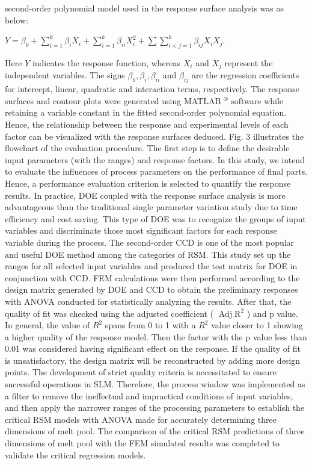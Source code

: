 \documentclass[10pt]{article}
\begin{document}
second-order polynomial model used in the response surface analysis was as below:

$Y=\beta_{0}+\sum_{i=1}^{k} \beta_{i} X_{i}+\sum_{i=1}^{k} \beta_{i i} X_{i}^{2}+\sum \sum_{i<j=1}^{k} \beta_{i j} X_{i} X_{j}$.

Here $Y$ indicates the response function, whereas $X_{i}$ and $X_{j}$ represent the independent variables. The signs $\beta_{0}, \beta_{i}, \beta_{i i}$ and $\beta_{i j}$ are the regression coefficients for intercept, linear, quadratic and interaction terms, respectively. The response surfaces and contour plots were generated using MATLAB ${ }^{\circledR}$ software while retaining a variable constant in the fitted second-order polynomial equation. Hence, the relationship between the response and experimental levels of each factor can be visualized with the response surfaces deduced. Fig. 3 illustrates the flowchart of the evaluation procedure. The first step is to define the desirable input parameters (with the ranges) and response factors. In this study, we intend to evaluate the influences of process parameters on the performance of final parts. Hence, a performance evaluation criterion is selected to quantify the response results. In practice, DOE coupled with the response surface analysis is more advantageous than the traditional single parameter variation study due to time efficiency and cost saving. This type of DOE was to recognize the groups of input variables and discriminate those most significant factors for each response variable during the process. The second-order CCD is one of the most popular and useful DOE method among the categories of RSM. This study set up the ranges for all selected input variables and produced the test matrix for DOE in conjunction with CCD. FEM calculations were then performed according to the design matrix generated by DOE and CCD to obtain the preliminary responses with ANOVA conducted for statistically analyzing the results. After that, the quality of fit was checked using the adjusted coefficient ( $\operatorname{Adj} \mathrm{R}^{2}$ ) and $\mathrm{p}$ value. In general, the value of $R^{2}$ spans from 0 to 1 with a $R^{2}$ value closer to 1 showing a higher quality of the response model. Then the factor with the $\mathrm{p}$ value less than 0.01 was considered having significant effect on the response. If the quality of fit is unsatisfactory, the design matrix will be reconstructed by adding more design points. The development of strict quality criteria is necessitated to ensure successful operations in SLM. Therefore, the process window was implemented as a filter to remove the ineffectual and impractical conditions of input variables, and then apply the narrower ranges of the processing parameters to establish the critical RSM models with ANOVA made for accurately determining three dimensions of melt pool. The comparison of the critical RSM predictions of three dimensions of melt pool with the FEM simulated results was completed to validate the critical regression models.
\end{document}
